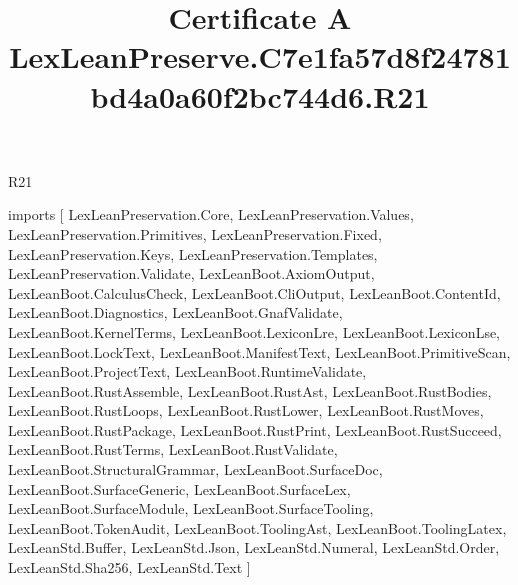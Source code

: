\begin{lexlean}{R21}
\title{Certificate A LexLeanPreserve.C7e1fa57d8f24781bd4a0a60f2bc744d6.R21}
\begin{coremodule}
imports [
  LexLeanPreservation.Core,
  LexLeanPreservation.Values,
  LexLeanPreservation.Primitives,
  LexLeanPreservation.Fixed,
  LexLeanPreservation.Keys,
  LexLeanPreservation.Templates,
  LexLeanPreservation.Validate,
  LexLeanBoot.AxiomOutput,
  LexLeanBoot.CalculusCheck,
  LexLeanBoot.CliOutput,
  LexLeanBoot.ContentId,
  LexLeanBoot.Diagnostics,
  LexLeanBoot.GnafValidate,
  LexLeanBoot.KernelTerms,
  LexLeanBoot.LexiconLre,
  LexLeanBoot.LexiconLse,
  LexLeanBoot.LockText,
  LexLeanBoot.ManifestText,
  LexLeanBoot.PrimitiveScan,
  LexLeanBoot.ProjectText,
  LexLeanBoot.RuntimeValidate,
  LexLeanBoot.RustAssemble,
  LexLeanBoot.RustAst,
  LexLeanBoot.RustBodies,
  LexLeanBoot.RustLoops,
  LexLeanBoot.RustLower,
  LexLeanBoot.RustMoves,
  LexLeanBoot.RustPackage,
  LexLeanBoot.RustPrint,
  LexLeanBoot.RustSucceed,
  LexLeanBoot.RustTerms,
  LexLeanBoot.RustValidate,
  LexLeanBoot.StructuralGrammar,
  LexLeanBoot.SurfaceDoc,
  LexLeanBoot.SurfaceGeneric,
  LexLeanBoot.SurfaceLex,
  LexLeanBoot.SurfaceModule,
  LexLeanBoot.SurfaceTooling,
  LexLeanBoot.TokenAudit,
  LexLeanBoot.ToolingAst,
  LexLeanBoot.ToolingLatex,
  LexLeanStd.Buffer,
  LexLeanStd.Json,
  LexLeanStd.Numeral,
  LexLeanStd.Order,
  LexLeanStd.Sha256,
  LexLeanStd.Text
]


\end{coremodule}
\end{lexlean}
